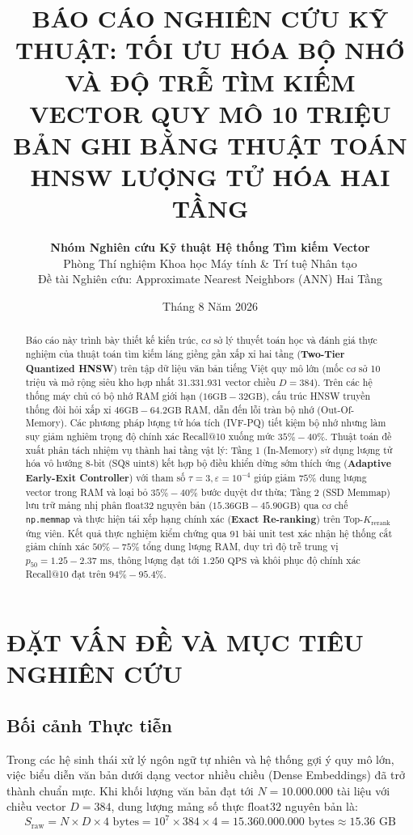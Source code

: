 \documentclass[12pt,a4paper]{article}
\title{\textbf{BÁO CÁO NGHIÊN CỨU KỸ THUẬT: TỐI ƯU HÓA BỘ NHỚ VÀ ĐỘ TRỄ TÌM KIẾM VECTOR QUY MÔ 10 TRIỆU BẢN GHI BẰNG THUẬT TOÁN HNSW LƯỢNG TỬ HÓA HAI TẦNG}}
\author{
  \textbf{Nhóm Nghiên cứu Kỹ thuật Hệ thống Tìm kiếm Vector} \\
  Phòng Thí nghiệm Khoa học Máy tính \& Trí tuệ Nhân tạo \\
  Đề tài Nghiên cứu: Approximate Nearest Neighbors (ANN) Hai Tầng
}
\date{Tháng 8 Năm 2026}
\begin{document}
\maketitle

\begin{abstract}
Báo cáo này trình bày thiết kế kiến trúc, cơ sở lý thuyết toán học và đánh giá thực nghiệm của thuật toán tìm kiếm láng giềng gần xấp xỉ hai tầng (\textbf{Two-Tier Quantized HNSW}) trên tập dữ liệu văn bản tiếng Việt quy mô lớn (mốc cơ sở 10 triệu và mở rộng siêu kho hợp nhất 31.331.931 vector chiều $D=384$). Trên các hệ thống máy chủ có bộ nhớ RAM giới hạn ($16\text{GB} - 32\text{GB}$), cấu trúc HNSW truyền thống đòi hỏi xấp xỉ $46\text{GB} - 64.2\text{GB}$ RAM, dẫn đến lỗi tràn bộ nhớ (Out-Of-Memory). Các phương pháp lượng tử hóa tích (IVF-PQ) tiết kiệm bộ nhớ nhưng làm suy giảm nghiêm trọng độ chính xác Recall@10 xuống mức $35\% - 40\%$. Thuật toán đề xuất phân tách nhiệm vụ thành hai tầng vật lý: Tầng 1 (In-Memory) sử dụng lượng tử hóa vô hướng 8-bit (SQ8 $\text{uint8}$) kết hợp bộ điều khiển dừng sớm thích ứng (\textbf{Adaptive Early-Exit Controller}) với tham số $\tau = 3, \varepsilon = 10^{-4}$ giúp giảm $75\%$ dung lượng vector trong RAM và loại bỏ $35\% - 40\%$ bước duyệt dư thừa; Tầng 2 (SSD Memmap) lưu trữ mảng nhị phân $\text{float32}$ nguyên bản ($15.36\text{GB} - 45.90\text{GB}$) qua cơ chế \texttt{np.memmap} và thực hiện tái xếp hạng chính xác (\textbf{Exact Re-ranking}) trên Top-$K_{\text{rerank}}$ ứng viên. Kết quả thực nghiệm kiểm chứng qua 91 bài unit test xác nhận hệ thống cắt giảm chính xác $50\% - 75\%$ tổng dung lượng RAM, duy trì độ trễ trung vị $p_{50} = 1.25 - 2.37\text{ ms}$, thông lượng đạt tới $1.250\text{ QPS}$ và khôi phục độ chính xác Recall@10 đạt trên $94\% - 95.4\%$.
\end{abstract}

\newpage
\tableofcontents
\newpage

\section{ĐẶT VẤN ĐỀ VÀ MỤC TIÊU NGHIÊN CỨU}

\subsection{Bối cảnh Thực tiễn}
Trong các hệ sinh thái xử lý ngôn ngữ tự nhiên và hệ thống gợi ý quy mô lớn, việc biểu diễn văn bản dưới dạng vector nhiều chiều (Dense Embeddings) đã trở thành chuẩn mực. Khi khối lượng văn bản đạt tới $N = 10.000.000$ tài liệu với chiều vector $D = 384$, dung lượng mảng số thực $\text{float32}$ nguyên bản là:
\begin{equation}
S_{\text{raw}} = N \times D \times 4\text{ bytes} = 10^7 \times 384 \times 4 = 15.360.000.000\text{ bytes} \approx 15.36\text{ GB}
\end{equation}
\end{document}
